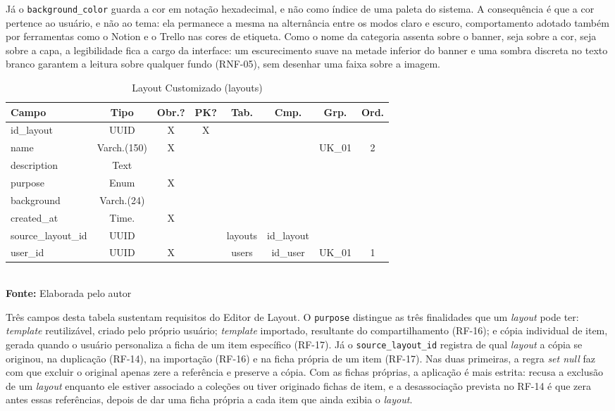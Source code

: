 Já o \texttt{background\_color} guarda a cor em notação hexadecimal, e não como índice de uma
paleta do sistema. A consequência é que a cor pertence ao usuário, e não ao tema: ela permanece a
mesma na alternância entre os modos claro e escuro, comportamento adotado também por ferramentas
como o Notion e o Trello nas cores de etiqueta. Como o nome da categoria assenta sobre o banner,
seja sobre a cor, seja sobre a capa, a legibilidade fica a cargo da interface: um escurecimento
suave na metade inferior do banner e uma sombra discreta no texto branco garantem a leitura sobre
qualquer fundo (RNF-05), sem desenhar uma faixa sobre a imagem.

\FloatBarrier
\begin{table}[!htbp]
\centering
\caption{Layout Customizado (layouts)}
\footnotesize
\begin{tabularx}{\textwidth}{ | X | c | c | c | c | c | c | c | }
    \hline
    \textbf{Campo} & \textbf{Tipo} & \textbf{Obr.?} & \textbf{PK?} & \textbf{Tab.} & \textbf{Cmp.} & \textbf{Grp.} & \textbf{Ord.}\\ \hline
    id\_layout & UUID & X & X &  &  &  &  \\ \hline
    name & Varch.(150) & X &  &  &  & UK\_01 & 2 \\ \hline
    description & Text &  &  &  &  &  &  \\ \hline
    purpose & Enum & X &  &  &  &  &  \\ \hline
    background & Varch.(24) &  &  &  &  &  &  \\ \hline
    created\_at & Time. & X &  &  &  &  &  \\ \hline
    source\_layout\_id & UUID &  &  & layouts & id\_layout &  &  \\ \hline
    user\_id & UUID & X &  & users & id\_user & UK\_01 & 1 \\ \hline
\end{tabularx}
\vspace{0.1cm} \\ \textbf{Fonte:} Elaborada pelo autor
\label{tab:tabelaLayoutDetalhado}
\end{table}

Três campos desta tabela sustentam requisitos do Editor de Layout. O \texttt{purpose} distingue as três finalidades que um \textit{layout} pode ter: \textit{template} reutilizável, criado pelo próprio usuário; \textit{template} importado, resultante do compartilhamento (RF-16); e cópia individual de item, gerada quando o usuário personaliza a ficha de um item específico (RF-17). Já o \texttt{source\_layout\_id} registra de qual \textit{layout} a cópia se originou, na duplicação (RF-14), na importação (RF-16) e na ficha própria de um item (RF-17). Nas duas primeiras, a regra \textit{set null} faz com que excluir o original apenas zere a referência e preserve a cópia. Com as fichas próprias, a aplicação é mais estrita: recusa a exclusão de um \textit{layout} enquanto ele estiver associado a coleções ou tiver originado fichas de item, e a desassociação prevista no RF-14 é que zera antes essas referências, depois de dar uma ficha própria a cada item que ainda exibia o \textit{layout}.

